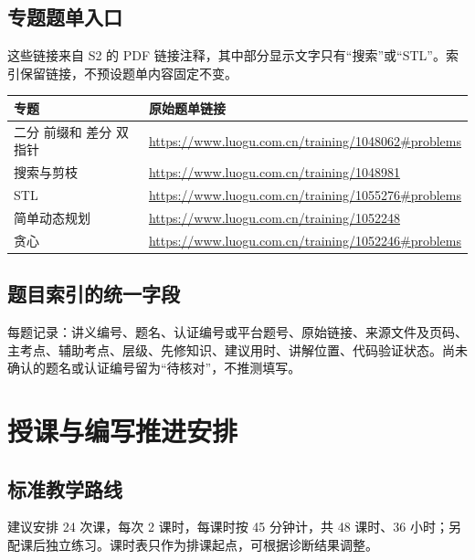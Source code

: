 \documentclass[UTF8,11pt,a4paper,fontset=none]{ctexart}
\begin{document}
\subsection{专题题单入口}
这些链接来自 S2 的 PDF 链接注释，其中部分显示文字只有“搜索”或“STL”。索引保留链接，不预设题单内容固定不变。
\begin{longtable}{P{4cm}P{10.9cm}}
\toprule 专题 & 原始题单链接 \\\midrule\endhead
二分 前缀和 差分 双指针 & \url{https://www.luogu.com.cn/training/1048062#problems}\\
搜索与剪枝 & \url{https://www.luogu.com.cn/training/1048981}\\
STL & \url{https://www.luogu.com.cn/training/1055276#problems}\\
简单动态规划 & \url{https://www.luogu.com.cn/training/1052248}\\
贪心 & \url{https://www.luogu.com.cn/training/1052246#problems}\\
\bottomrule
\end{longtable}

\subsection{题目索引的统一字段}
每题记录：讲义编号、题名、认证编号或平台题号、原始链接、来源文件及页码、主考点、辅助考点、层级、先修知识、建议用时、讲解位置、代码验证状态。尚未确认的题名或认证编号留为“待核对”，不推测填写。

\section{授课与编写推进安排}
\subsection{标准教学路线}
建议安排 24 次课，每次 2 课时，每课时按 45 分钟计，共 48 课时、36 小时；另配课后独立练习。课时表只作为排课起点，可根据诊断结果调整。
\end{document}
